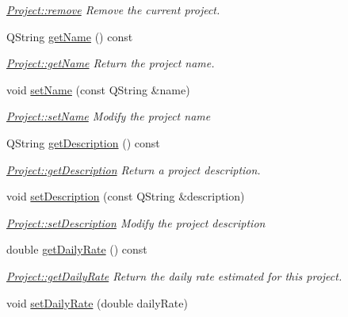 \begin{DoxyCompactItemize}
\begin{DoxyCompactList}\small\item\em \hyperlink{classProject_a7bd735a59c2fdf2718db14c3073245fc}{Project\+::remove} Remove the current project. \end{DoxyCompactList}\item 
Q\+String \hyperlink{classProject_af547be6d3433bbf4ccf0f905788a9fee}{get\+Name} () const 
\begin{DoxyCompactList}\small\item\em \hyperlink{classProject_af547be6d3433bbf4ccf0f905788a9fee}{Project\+::get\+Name} Return the project name. \end{DoxyCompactList}\item 
void \hyperlink{classProject_ab330ed5176b1eb93b558676fff8c47e1}{set\+Name} (const Q\+String \&name)
\begin{DoxyCompactList}\small\item\em \hyperlink{classProject_ab330ed5176b1eb93b558676fff8c47e1}{Project\+::set\+Name} Modify the project {\itshape name} \end{DoxyCompactList}\item 
Q\+String \hyperlink{classProject_ae7cc47cfca8038bf63b67f0d255e92dd}{get\+Description} () const 
\begin{DoxyCompactList}\small\item\em \hyperlink{classProject_ae7cc47cfca8038bf63b67f0d255e92dd}{Project\+::get\+Description} Return a project description. \end{DoxyCompactList}\item 
void \hyperlink{classProject_a08632a8a8905245559c844c863fc796b}{set\+Description} (const Q\+String \&description)
\begin{DoxyCompactList}\small\item\em \hyperlink{classProject_a08632a8a8905245559c844c863fc796b}{Project\+::set\+Description} Modify the project {\itshape description} \end{DoxyCompactList}\item 
double \hyperlink{classProject_a1f34916428682e0134675d45f93a2173}{get\+Daily\+Rate} () const 
\begin{DoxyCompactList}\small\item\em \hyperlink{classProject_a1f34916428682e0134675d45f93a2173}{Project\+::get\+Daily\+Rate} Return the daily rate estimated for this project. \end{DoxyCompactList}\item 
void \hyperlink{classProject_aa3c6dc9722ed16fd69a6034b2398a7c9}{set\+Daily\+Rate} (double daily\+Rate)

\end{DoxyCompactItemize}
